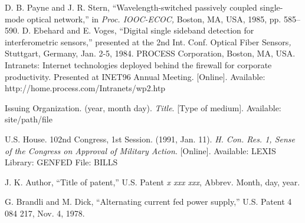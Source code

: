 \documentclass[correspondence]{IEEEtaes}
\begin{document}
\vspace*{-12pt}
\begin{thebibliography}{[31d]}
\setcounter{enumiv}{13}
D. B. Payne and J. R. Stern, ``Wavelength-switched passively coupled single-mode optical network,'' in \emph{Proc. IOOC-ECOC,} Boston, MA, USA, 1985, pp. 585--590.
D. Ebehard and E. Voges, ``Digital single sideband detection for interferometric sensors,'' presented at the 2nd Int. Conf. Optical Fiber Sensors\emph{,} Stuttgart, Germany, Jan. 2-5, 1984.
PROCESS Corporation, Boston, MA, USA. Intranets: Internet technologies deployed behind the firewall for corporate productivity. Presented at INET96 Annual Meeting. {[}Online{]}. Available: http://home.process.com/Intranets/wp2.htp
\end{thebibliography}

\vspace*{-12pt}
\begin{thebibliography}{[31d]}
\item[] Issuing Organization. (year, month day). \emph{Title}. {[}Type of medium{]}. Available: site/path/file
\end{thebibliography}

\vspace*{-12pt}
\begin{thebibliography}{[31d]}
\setcounter{enumiv}{16}
U.S. House. 102nd Congress, 1st Session. (1991, Jan. 11). \emph{H. Con. Res. 1, Sense of the Congress on Approval of Military Action}. {[}Online{]}. Available: LEXIS Library: GENFED File: BILLS
\end{thebibliography}

\vspace*{-12pt}
\begin{thebibliography}{[31d]}
\item[] J. K. Author, ``Title of patent,'' U.S. Patent \emph{x xxx xxx}, Abbrev. Month, day, year.
\end{thebibliography}

\vspace*{-12pt}
\begin{thebibliography}{[31d]}
\setcounter{enumiv}{17}
   G. Brandli and M. Dick, ``Alternating current fed power supply,'' U.S. Patent 4 084 217, Nov. 4, 1978.
\end{thebibliography}
\end{document}
